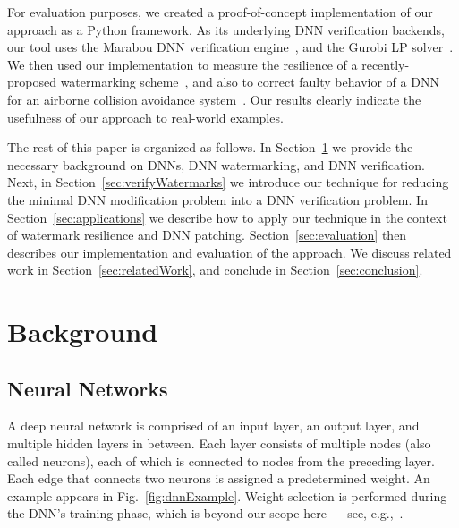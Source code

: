 \documentclass{easychair}
\begin{document}
For evaluation purposes, we created a proof-of-concept implementation
of our approach as a Python framework. As its underlying DNN
verification backends, our
tool uses the Marabou DNN verification
engine~\cite{KaHuIbJuLaLiShThWuZeDiKoBa19Marabou}, and the Gurobi LP
solver~\cite{gurobi}. We then used our implementation to measure the resilience
of a recently-proposed watermarking
scheme~\cite{AdBaPiKeWatermarking}, and also to correct faulty
behavior of a DNN for an airborne collision avoidance
system~\cite{JuLoBrOwKo16,KaBaDiJuKo17Reluplex}. Our results clearly
indicate the usefulness of our approach to real-world examples.

The rest of this paper is organized as follows. In
Section~\ref{sec:background} we provide the necessary background on
DNNs, DNN watermarking, and DNN verification. Next, in
Section~\ref{sec:verifyWatermarks} we introduce our technique for
reducing the minimal DNN modification problem into a DNN verification
problem. In Section~\ref{sec:applications} we describe how to apply 
our technique in the context of watermark resilience and DNN patching.
Section~\ref{sec:evaluation} then describes our implementation and
evaluation of the approach.
We discuss related work in Section~\ref{sec:relatedWork},
and conclude in Section~\ref{sec:conclusion}.

\section{Background}
\label{sec:background}

\subsection{Neural Networks}
A deep neural network is comprised of an input layer, an output layer,
and multiple hidden layers in between. Each layer consists of multiple
nodes (also called neurons), each of which is connected to nodes from
the preceding layer. Each edge that connects two neurons is assigned a
predetermined weight. An example appears in
Fig.~\ref{fig:dnnExample}. Weight selection
is performed during the DNN's training phase, which is beyond our
scope here --- see, e.g.,~\cite{FoBeCu16}. 
\end{document}
